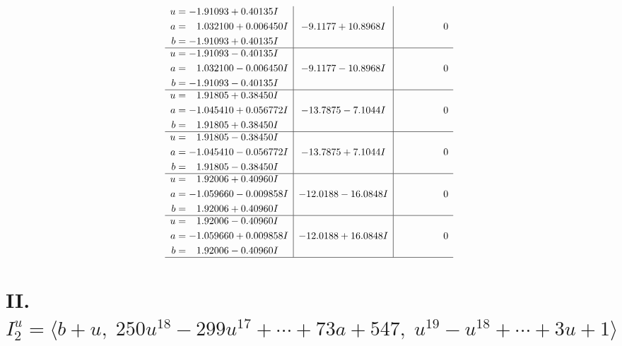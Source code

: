 \documentclass[1p]{elsarticle_modified}
\theoremstyle{definition}
\begin{document}
$$\begin{array}{c|c|c}
\begin{aligned}
u &= -1.91093 + 0.40135 I \\
a &= \phantom{-}1.032100 + 0.006450 I \\
b &= -1.91093 + 0.40135 I\end{aligned}
 & -9.1177 + 10.8968 I & \phantom{-0.000000 } 0 \\ \hline\begin{aligned}
u &= -1.91093 - 0.40135 I \\
a &= \phantom{-}1.032100 - 0.006450 I \\
b &= -1.91093 - 0.40135 I\end{aligned}
 & -9.1177 - 10.8968 I & \phantom{-0.000000 } 0 \\ \hline\begin{aligned}
u &= \phantom{-}1.91805 + 0.38450 I \\
a &= -1.045410 + 0.056772 I \\
b &= \phantom{-}1.91805 + 0.38450 I\end{aligned}
 & -13.7875 - 7.1044 I & \phantom{-0.000000 } 0 \\ \hline\begin{aligned}
u &= \phantom{-}1.91805 - 0.38450 I \\
a &= -1.045410 - 0.056772 I \\
b &= \phantom{-}1.91805 - 0.38450 I\end{aligned}
 & -13.7875 + 7.1044 I & \phantom{-0.000000 } 0 \\ \hline\begin{aligned}
u &= \phantom{-}1.92006 + 0.40960 I \\
a &= -1.059660 - 0.009858 I \\
b &= \phantom{-}1.92006 + 0.40960 I\end{aligned}
 & -12.0188 - 16.0848 I & \phantom{-0.000000 } 0 \\ \hline\begin{aligned}
u &= \phantom{-}1.92006 - 0.40960 I \\
a &= -1.059660 + 0.009858 I \\
b &= \phantom{-}1.92006 - 0.40960 I\end{aligned}
 & -12.0188 + 16.0848 I & \phantom{-0.000000 } 0\\
 \hline 
 \end{array}$$\newpage\newpage\renewcommand{\arraystretch}{1}
\centering \section*{II. $I^u_{2}= \langle b+u,\;250 u^{18}-299 u^{17}+\cdots+73 a+547,\;u^{19}- u^{18}+\cdots+3 u+1 \rangle$}
\end{document}
